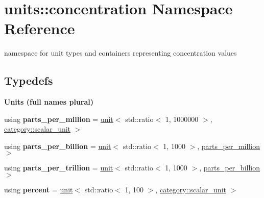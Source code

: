 \hypertarget{namespaceunits_1_1concentration}{}\section{units\+:\+:concentration Namespace Reference}
\label{namespaceunits_1_1concentration}


namespace for unit types and containers representing concentration values  


\subsection*{Typedefs}
\begin{Indent}{\bf Units (full names plural)}\par
\begin{DoxyCompactItemize}
\item 
\hypertarget{namespaceunits_1_1concentration_a6c943ef89ee96e0e586d98fc38effd1d}{}using {\bfseries parts\+\_\+per\+\_\+million} = \hyperlink{structunits_1_1unit}{unit}$<$ std\+::ratio$<$ 1, 1000000 $>$, \hyperlink{namespaceunits_1_1category_ad633be0ea9f0ebaefb2a648244a5d816}{category\+::scalar\+\_\+unit} $>$\label{namespaceunits_1_1concentration_a6c943ef89ee96e0e586d98fc38effd1d}

\item 
\hypertarget{namespaceunits_1_1concentration_ad33ea6b0df3b65e90cffdb977ab50827}{}using {\bfseries parts\+\_\+per\+\_\+billion} = \hyperlink{structunits_1_1unit}{unit}$<$ std\+::ratio$<$ 1, 1000 $>$, \hyperlink{structunits_1_1unit}{parts\+\_\+per\+\_\+million} $>$\label{namespaceunits_1_1concentration_ad33ea6b0df3b65e90cffdb977ab50827}

\item 
\hypertarget{namespaceunits_1_1concentration_a9a81a0d7f560bed8bc9d04586495c998}{}using {\bfseries parts\+\_\+per\+\_\+trillion} = \hyperlink{structunits_1_1unit}{unit}$<$ std\+::ratio$<$ 1, 1000 $>$, \hyperlink{structunits_1_1unit}{parts\+\_\+per\+\_\+billion} $>$\label{namespaceunits_1_1concentration_a9a81a0d7f560bed8bc9d04586495c998}

\item 
\hypertarget{namespaceunits_1_1concentration_afcf07f5d5798e516b144af4da039e427}{}using {\bfseries percent} = \hyperlink{structunits_1_1unit}{unit}$<$ std\+::ratio$<$ 1, 100 $>$, \hyperlink{namespaceunits_1_1category_ad633be0ea9f0ebaefb2a648244a5d816}{category\+::scalar\+\_\+unit} $>$\label{namespaceunits_1_1concentration_afcf07f5d5798e516b144af4da039e427}

\end{DoxyCompactItemize}
\end{Indent}
